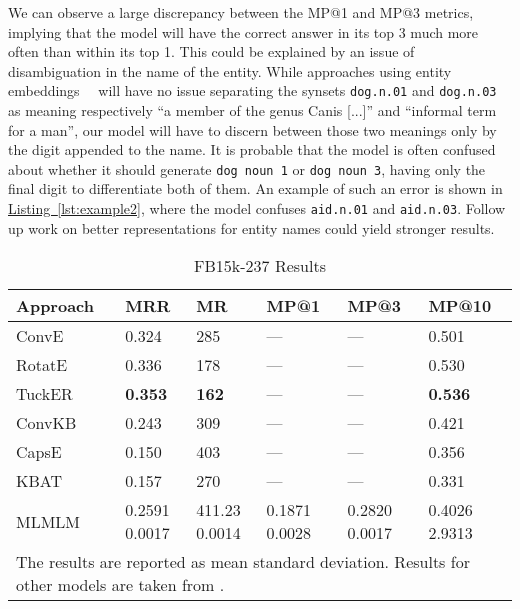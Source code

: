 \documentclass[11pt,a4paper]{article}
\newcommand{\CiteT}[1]{\citet{#1}} \newcommand{\CiteP}[1]{~\citep{#1}} \newcommand{\CodeT}[1]{\texttt{#1}}
\newcommand{\RefListing}[1]{\hyperref[#1]{Listing~\ref{#1}}}
\newcommand{\TableW}[3]{\begin{table*}[h!]
\begin{center}
  \caption{#3} 
  \vspace{-0.25\baselineskip}
  \label{#2}
  #1
\end{center}
\end{table*}}
\begin{document}
We can observe a large discrepancy between the MP@1 and MP@3 metrics, implying that the model will have the correct answer in its top 3 much more often than within its top 1. 
This could be explained by an issue of disambiguation in the name of the entity.
While approaches using entity embeddings~\CiteP{EMB1, EMB2, EMB3} will have no issue separating the synsets \texttt{dog.n.01} and \texttt{dog.n.03} as meaning respectively ``a member of the genus Canis [...]'' and ``informal term for a man'', our model will have to discern between those two meanings only by the digit appended to the name.
It is probable that the model is often confused about whether it should generate \texttt{dog~noun~1} or \texttt{dog~noun~3}, having only the final digit to differentiate both of them.
An example of such an error is shown in \RefListing{lst:example2}, where the model confuses \texttt{aid.n.01} and \texttt{aid.n.03}.
Follow up work on better representations for entity names could yield stronger results.
\TableW{\begin{tabular}{m{}m{}m{0.1\textwidth}m{0.1\textwidth}m{0.1\textwidth}m{0.1\textwidth}}
    \toprule
    Approach & MRR  & MR  & MP@1  & MP@3  & MP@10 \\
    \midrule
    ConvE & 0.324 & 285 & --- & --- & 0.501\\
    RotatE & 0.336 & 178 & --- & --- & 0.530\\
    TuckER & \textbf{0.353} & \textbf{162} & --- & --- & \textbf{0.536}\\
    \midrule
    ConvKB & 0.243 & 309 & --- & --- & 0.421\\
    CapsE & 0.150 & 403 & --- & --- & 0.356\\
    KBAT & 0.157 & 270 & --- & --- & 0.331\\
    \midrule
    MLMLM & 
        \shortstack[l]{{0.2591}\\{\small 0.0017}} &
        \shortstack[l]{{411.23}\\{\small 0.0014}} &
        \shortstack[l]{{0.1871}\\{\small 0.0028}} &
        \shortstack[l]{{0.2820}\\{\small 0.0017}} &
        \shortstack[l]{{0.4026}\\{\small 2.9313}}\\
    \bottomrule
    \multicolumn{6}{p{.8\textwidth}}{\small The results are reported as mean  standard deviation. Results for other models are taken from \CiteT{ReevaluationKB}.}

  \end{tabular}}
{tab:results_FB15k}
{FB15k-237 Results}
\end{document}
